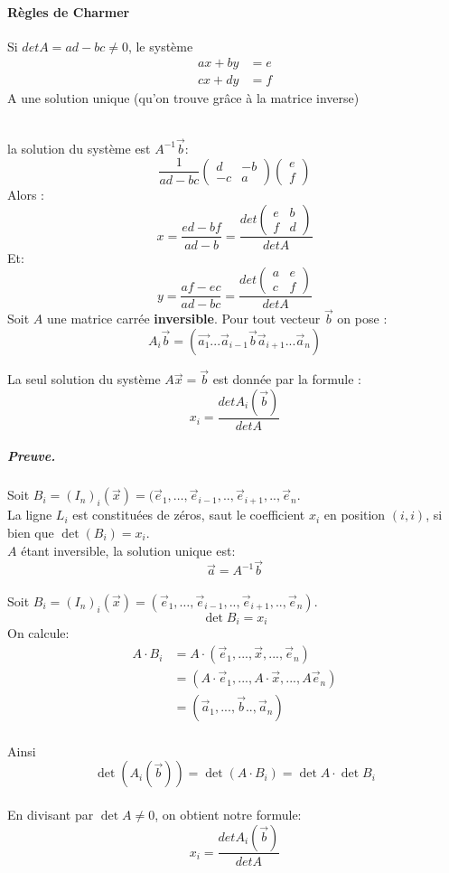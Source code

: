 \documentclass[11pt]{book}
\begin{document}
    \paragraph{Règles de Charmer}
    \begin{theoreme}
        
    
    Si $det A = ad-bc \neq 0$, le système
    \begin{align*}
        ax + by &= e\\
        cx + dy &= f
    \end{align*}
    A une solution unique (qu'on trouve grâce à la matrice inverse)
    \end{theoreme}
    \\
    
la solution du système est $A^{-1}\vec{b}$: 
\[\frac{1}{ad -bc}\begin{pmatrix}
    d & -b \\
    -c & a
\end{pmatrix}
\begin{pmatrix}
    e \\
    f
\end{pmatrix}\]
Alors : 
\[x = \frac{ed -bf}{ad -b} =  \frac{det\begin{pmatrix}
    e & b \\
    f & d
\end{pmatrix}} {det A}\]
Et:
\[
y = \frac{af - ec}{ad - bc} = \frac{det \begin{pmatrix}
    a & e \\
    c & f
\end{pmatrix}}{det A}
\]
Soit $A$ une matrice carrée \textbf{inversible}. Pour tout vecteur $\vec{b}$ on pose :
\[A_i\vec{b} = (\vec{a_1}... \vec{a}_{i-1} \vec{b} \vec{a}_{i+ 1} ... \vec{a}_n)\]

    La seul solution du système $A\vec{x} = \vec{b}$ est donnée par la formule : 
    \[
    x_i = \frac{detA_i(\vec{b})}{det A}
    \]
\subparagraph{Preuve.}
Soit $B_i = (I_n)_i(\vec{x}) = (\vec{e}_1,\dots, \vec{e}_{i-1}, .., \vec{e}_{i+1}, .., \vec{e}_n  $.
\\
La ligne $L_i$ est constituées de zéros, saut le coefficient $x_i$ en position $(i, i)$, si bien que $\det (B_i) = x_i$.
\\
$A$ étant inversible, la solution unique est:
\[\vec{a} = A^{-1}\vec{b}\]
\\
Soit $B_i = (I_n)_i(\vec{x}) = (\vec{e}_1,\dots, \vec{e}_{i-1}, .., \vec{e}_{i+1}, .., \vec{e}_n)$.
\\
\[\det B_i = x_i\]
On calcule:
\\
\begin{align*}
A\cdot B_i &= A\cdot(\vec{e}_1, ..., \vec{x}, ..., \vec{e}_n)\\
&= (A\cdot\vec{e}_1, ..., A\cdot\vec{x}, ..., A\vec{e}_n)\\
&= (\vec{a}_1, ..., \vec{b} .., \vec{a}_n)    
\end{align*}
\\
Ainsi \[\det(A_i(\vec{b})) = \det(A\cdot B_i) = \det A \cdot \det B_i\]
\\
En divisant par $\det A \neq 0$, on obtient notre formule:
    \[
    x_i = \frac{detA_i(\vec{b})}{det A}
    \]



\end{document}
